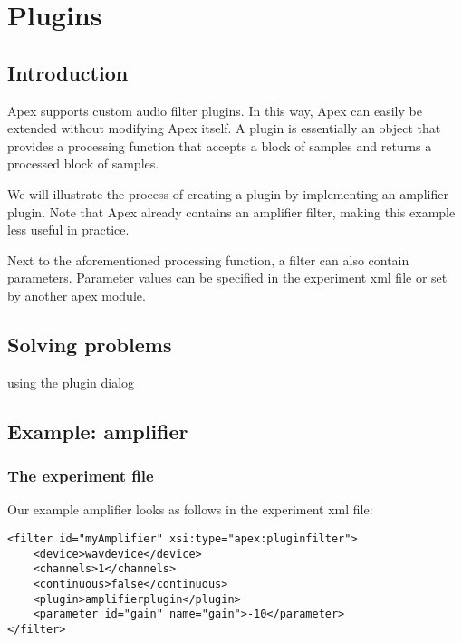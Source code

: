 

\chapter{Plugins}
\label{sec:plugins}

\section{Introduction}
Apex supports custom audio filter plugins. In this way, Apex can easily be extended without modifying Apex itself. A plugin is essentially an object that provides a processing function that accepts a block of samples and returns a processed block of samples.

We will illustrate the process of creating a plugin by implementing an amplifier plugin. Note that Apex already contains an amplifier filter, making this example less useful in practice.

Next to the aforementioned processing function, a filter can also contain parameters. Parameter values can be specified in the experiment xml file or set by another apex module.

\label{sec:plugins}

\section{Solving problems}

using the plugin dialog


\section{Example: amplifier}


\subsection{The experiment file}

Our example amplifier looks as follows in the experiment xml file:

\begin{verbatim}
<filter id="myAmplifier" xsi:type="apex:pluginfilter">
    <device>wavdevice</device>
    <channels>1</channels>
    <continuous>false</continuous>
    <plugin>amplifierplugin</plugin>
    <parameter id="gain" name="gain">-10</parameter>
</filter>
\end{verbatim}


